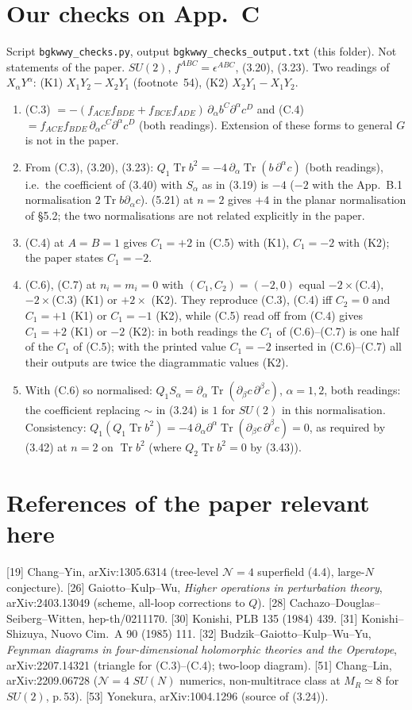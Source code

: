 \documentclass[11pt]{article}
\newcommand{\Tr}{\operatorname{Tr}}
\begin{document}
\section{Our checks on App.~C}
Script \texttt{bgkwwy\_checks.py}, output \texttt{bgkwwy\_checks\_output.txt} (this folder). Not statements of the paper. $SU(2)$, $f^{ABC}=\epsilon^{ABC}$, (3.20), (3.23). Two readings of $X_\alpha Y^\alpha$: (K1) $X_1Y_2-X_2Y_1$ (footnote~54), (K2) $X_2Y_1-X_1Y_2$.
\begin{enumerate}
\item (C.3) $=-(f_{ACE}f_{BDE}+f_{BCE}f_{ADE})\,\partial_\alpha b^C\partial^\alpha c^D$ and (C.4) $=f_{ACE}f_{BDE}\,\partial_\alpha c^C\partial^\alpha c^D$ (both readings). Extension of these forms to general $G$ is not in the paper.
\item From (C.3), (3.20), (3.23): $Q_1\Tr b^2=-4\,\partial_\alpha\Tr(b\,\partial^\alpha c)$ (both readings), i.e.\ the coefficient of (3.40) with $S_\alpha$ as in (3.19) is $-4$ ($-2$ with the App.~B.1 normalisation $2\Tr b\partial_\alpha c$). (5.21) at $n=2$ gives $+4$ in the planar normalisation of §5.2; the two normalisations are not related explicitly in the paper.
\item (C.4) at $A=B=1$ gives $C_1=+2$ in (C.5) with (K1), $C_1=-2$ with (K2); the paper states $C_1=-2$.
\item (C.6), (C.7) at $n_i=m_i=0$ with $(C_1,C_2)=(-2,0)$ equal $-2\times$(C.4), $-2\times$(C.3) (K1) or $+2\times$ (K2). They reproduce (C.3), (C.4) iff $C_2=0$ and $C_1=+1$ (K1) or $C_1=-1$ (K2), while (C.5) read off from (C.4) gives $C_1=+2$ (K1) or $-2$ (K2): in both readings the $C_1$ of (C.6)--(C.7) is one half of the $C_1$ of (C.5); with the printed value $C_1=-2$ inserted in (C.6)--(C.7) all their outputs are twice the diagrammatic values (K2).
\item With (C.6) so normalised: $Q_1S_\alpha=\partial_\alpha\Tr(\partial_\beta c\,\partial^\beta c)$, $\alpha=1,2$, both readings: the coefficient replacing $\sim$ in (3.24) is $1$ for $SU(2)$ in this normalisation. Consistency: $Q_1(Q_1\Tr b^2)=-4\,\partial_\alpha\partial^\alpha\Tr(\partial_\beta c\,\partial^\beta c)=0$, as required by (3.42) at $n=2$ on $\Tr b^2$ (where $Q_2\Tr b^2=0$ by (3.43)).
\end{enumerate}

\section{References of the paper relevant here}
[19] Chang--Yin, arXiv:1305.6314 (tree-level $\mathcal N=4$ superfield (4.4), large-$N$ conjecture). [26] Gaiotto--Kulp--Wu, \emph{Higher operations in perturbation theory}, arXiv:2403.13049 (scheme, all-loop corrections to $Q$). [28] Cachazo--Douglas--Seiberg--Witten, hep-th/0211170. [30] Konishi, PLB 135 (1984) 439. [31] Konishi--Shizuya, Nuovo Cim.\ A 90 (1985) 111. [32] Budzik--Gaiotto--Kulp--Wu--Yu, \emph{Feynman diagrams in four-dimensional holomorphic theories and the Operatope}, arXiv:2207.14321 (triangle for (C.3)--(C.4); two-loop diagram). [51] Chang--Lin, arXiv:2209.06728 ($\mathcal N=4$ $SU(N)$ numerics, non-multitrace class at $M_R\simeq8$ for $SU(2)$, p.\,53). [53] Yonekura, arXiv:1004.1296 (source of (3.24)).
\end{document}
